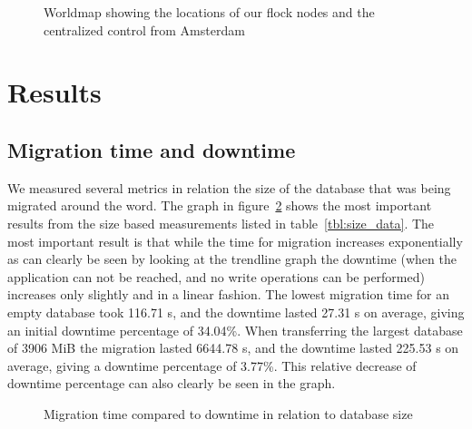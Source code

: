 \documentclass{article}
\begin{document}
\begin{center}
\begin{figure}[!ht]
    \caption{Worldmap showing the locations of our flock nodes and the centralized control from Amsterdam}
    \label{fig:world_map}
\end{figure}
\end{center}



\clearpage
\section{Results}
\subsection{Migration time and downtime}

We measured several metrics in relation the size of the database that was being migrated around the word. The graph in figure~\ref{fig:migration_size} shows the most important results from the size based measurements listed in table~\ref{tbl:size_data}. The most important result is that while the time for migration increases exponentially as can clearly be seen by looking at the trendline graph the downtime (when the application can not be reached, and no write operations can be performed) increases only slightly and in a linear fashion. The lowest migration time for an empty database took 116.71 s, and the downtime lasted 27.31 s on average, giving an initial downtime percentage of 34.04\%.
When transferring the largest database of 3906 MiB the migration lasted 6644.78 s, and the downtime lasted 225.53 s on average, giving a downtime percentage of 3.77\%. This relative decrease of downtime percentage can also clearly be seen in the graph.

\begin{center}
\begin{figure}[!ht]
    \caption{Migration time compared to downtime in relation to database size}
    \label{fig:migration_size}
\end{figure}
\end{center}
\end{document}
